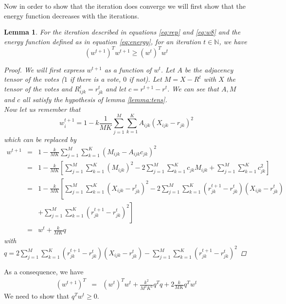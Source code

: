 \documentclass[12pt,a4paper]{article}
\newtheorem{lemma}{Lemma}
\begin{document}
Now in order to show that the iteration does converge we will first show that the energy function decreases with the iterations.
\begin{lemma}
For the iteration described in equations \ref{eq:rep} and \ref{eq:w8} and the energy function defined as in equation \ref{eq:energy}, for an iteration $t\in \mathbb{N}$, we have 
$$(w^{t+1})^Tw^{t+1} \geq (w^t)^Tw^t$$
\begin{proof}
We will first express $w^{t+1}$ as a function of $w^t$.
Let $A$ be the adjacency tensor of the votes ($1$ if there is a vote, $0$ if not). Let $M = X - R^t$ with $X$ the tensor of the votes and $R^t_{ijk} = r^t_{jk}$ and let $c = r^{t+1}-r^{t}$. We can see that $A,M$ and $c$ all satisfy the hypothesis of lemma \ref{lemma:tens}.\\
Now let us remember that 
$$w_i^{t+1} = 1 - k \frac{1}{MK} \sum_{j=1}^M \sum_{k=1}^K A_{ijk}(X_{ijk}-r_{jk})^2$$
which can be replaced by
\begin{eqnarray*}
w^{t+1} & = & 1 - \frac{k}{MK} \sum_{j=1}^M \sum_{k=1}^K  (M_{ijk} - A_{ijk}c_{jk})^2\\
& = & 1- \frac{k}{MK}\left[ \sum_{j=1}^M \sum_{k=1}^K (M_{ijk})^2 - 2 \sum_{j=1}^M \sum_{k=1}^K c_{jk}M_{ijk} + \sum_{j=1}^M \sum_{k=1}^K  c_{jk}^2 \right]\\
& = & 1 - \frac{k}{MK}\left[ \sum_{j=1}^M \sum_{k=1}^K (X_{ijk}-r_{jk}^t)^2  - 2 \sum_{j=1}^M \sum_{k=1}^K (r^{t+1}_{jk}-r^t_{jk})(X_{ijk}-r^t_{jk}) \right.\\
& & \left. + \sum_{j=1}^M \sum_{k=1}^K  (r^{t+1}_{jk} - r^t_{jk})^2 \right]\\
& = & w^t + \frac{k}{MK} q
\end{eqnarray*}
with $q = 2 \sum_{j=1}^M \sum_{k=1}^K (r^{t+1}_{jk}-r^t_{jk})(X_{ijk}-r^t_{jk}) - \sum_{j=1}^M \sum_{k=1}^K  (r^{t+1}_{jk} - r^t_{jk})^2 $
\end{proof}
\end{lemma}

As a consequence, we have
\begin{eqnarray*}
(w^{t+1})^T & = & (w^t)^Tw^t + \frac{k^2}{M^2K^2} q^Tq + 2 \frac{k}{MK} q^T w^t
\end{eqnarray*}
We need to show that $q^Tw^t \geq 0$.
\end{document}
